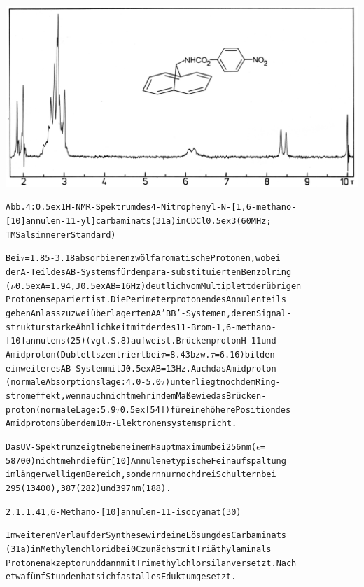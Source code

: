 \documentclass[a4paper,11pt]{article}
\begin{document}
\hspace*{-0.25cm}\includegraphics[width=14.68cm]{NMR_004}
\begin{alltt}
Abb. 4: \raise0.5ex\hbox{1}H-NMR-Spektrum des 4-Nitrophenyl-N-[1,6-methano-
[10]annulen-11-yl]carbaminats (31a) in CDCl\lower0.5ex\hbox{3} (60 MHz;
TMS als innerer Standard)

Bei \(\tau\) = 1.85 - 3.18 absorbieren zwölf aromatische Protonen, wobei
der A-Teil des AB-Systems für den para-substituierten Benzolring
(\(\nu\)\lower0.5ex\hbox{A} = 1.94, J\lower0.5ex\hbox{AB} = 16 Hz) deutlich vom Multiplett der übrigen
Protonen separiert ist. Die Perimeterprotonen des Annulenteils
geben Anlass zu zwei überlagerten AA'BB'-Systemen, deren Signal-
struktur starke Ähnlichkeit mit der des 11-Brom-1‚6-methano-
[10]annulens (25) (vgl. S. 8) aufweist. Brückenproton H-11 und
Amidproton (Dubletts zentriert bei \(\tau\) = 8.43 bzw. \(\tau\) = 6.16) bilden
ein weiteres AB-System mit J\lower0.5ex\hbox{AB} = 13 Hz. Auch das Amidproton
(normale Absorptionslage: 4.0 - 5.0 \(\tau\)) unterliegt noch dem Ring-
stromeffekt, wenn auch nicht mehr in dem Maße wie das Brücken-
proton (normale Lage: 5.9 \(\tau\) \raise0.5ex\hbox{[54]}) für eine höhere Position des
Amidprotons über dem 10\(\pi\)-Elektronensystem spricht.
\newpage
{}


Das UV-Spektrum zeigt neben einem Hauptmaximum bei 256 nm (\(\epsilon\) =
58700) nicht mehr die für [10]Annulene typische Feinaufspaltung
im länger welligen Bereich, sondern nur noch drei Schultern bei
295 (13400), 387 (282) und 397 nm (188).

2.1.1.4 1‚6-Methano-[10]annulen-11-isocyanat (30)

Im weiteren Verlauf der Synthese wird eine Lösung des Carbaminats
(31a) in Methylenchlorid bei 0\degree{}C zunächst mit Triäthylamin als
Protonenakzeptor und dann mit Trimethylchlorsilan versetzt. Nach
etwa fünf Stunden hat sich fast alles Edukt umgesetzt.

\end{alltt}
\end{document}
